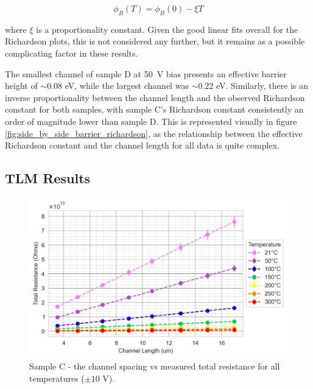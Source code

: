 \begin{refsection}
 \begin{equation}
     \phi_{B}(T) = \phi_{B}(0) - \xi T
     \label{eq:temp_dependent_barrier}
 \end{equation}
 
where $\xi$ is a proportionality constant. Given the good linear fits overall for the Richardson plots, this is not considered any further, but it remains as a possible complicating factor in these results. 
 
The smallest channel of sample D at 50~\si{\volt} bias presents an effective barrier height of $\sim0.08$ \si{\electronvolt}, while the largest channel was $\sim0.22$ \si{\electronvolt}. Similarly, there is an inverse proportionality between the channel length and the observed Richardson constant for both samples, with sample C's Richardson constant consistently an order of magnitude lower than sample D. This is represented visually in figure \ref{fig:side_by_side_barrier_richardson}, as the relationship between the effective Richardson constant and the channel length for all data is quite complex. 

\subsection{TLM Results}
\begin{figure}[H]
    \centering
    \includegraphics[width=\textwidth]{Chapter3/Figs/Raster/Sample C 2019/TLM/All Lin Reg TLM Plot Linear scale.png}
    \caption{Sample C - the channel spacing vs measured total resistance for all temperatures ($\pm10$ \si{\volt}).}
    \label{fig:c_tlm_lin}
\end{figure}


\end{refsection}
